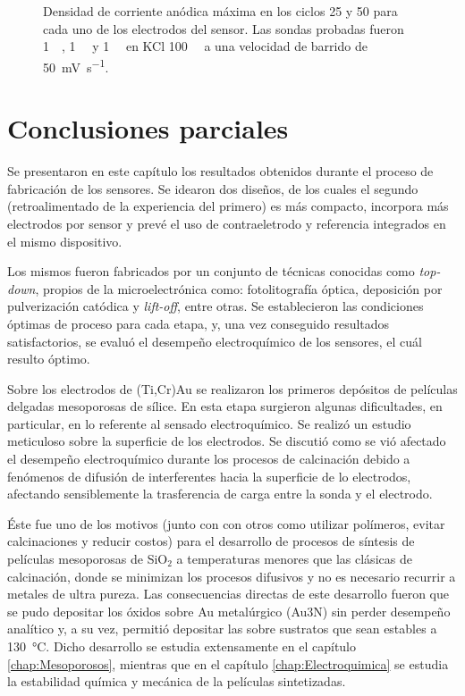 \begin{figure}[h!]
\begin{subfigure}[t]{0.329\textwidth}
		 	   \end{subfigure}
		      	\caption[Corriente de pico en distintos ciclos voltamperometricos]{Densidad de corriente anódica máxima en los ciclos 25 y 50 para cada uno de los electrodos del sensor. Las sondas probadas fueron \fc \SI{1}{\milli\Molar}, \fe\space \SI{1}{\milli\Molar} y \ru\space \SI{1}{\milli\Molar} en KCl \SI{100}{\milli\Molar} a una velocidad de barrido de \SI{50}{\milli\volt\per\second}.}
		      	\label{fig:barras}
		      	\end{figure}
 
\section{Conclusiones parciales}

	Se presentaron en este capítulo los resultados obtenidos durante el proceso de fabricación de los sensores. Se idearon dos diseños, de los cuales el segundo (retroalimentado de la experiencia del primero) es más compacto, incorpora más electrodos por sensor y prevé el uso de contraeletrodo y referencia integrados en el mismo dispositivo.
	
	Los mismos fueron fabricados por un conjunto de técnicas conocidas como \textit{top-down}, propios de la microelectrónica como: fotolitografía óptica, deposición por pulverización catódica y \textit{lift-off}, entre otras. Se establecieron las condiciones óptimas de proceso para cada etapa, y, una vez conseguido resultados satisfactorios, se evaluó el desempeño electroquímico de los sensores, el cuál resulto óptimo. 

	Sobre los electrodos de (Ti,Cr)\textbar Au se realizaron los primeros depósitos de películas delgadas mesoporosas de sílice. En esta etapa surgieron algunas dificultades, en particular, en lo referente al sensado electroquímico. Se realizó un estudio meticuloso sobre la superficie de los electrodos.  Se discutió como se vió afectado el desempeño electroquímico durante los procesos de calcinación debido a fenómenos de difusión de interferentes hacia la superficie de lo electrodos, afectando sensiblemente la trasferencia de carga entre la sonda y el electrodo. 

	Éste fue uno de los motivos (junto con con otros como utilizar polímeros, evitar calcinaciones y reducir costos) para el desarrollo de procesos de síntesis de películas mesoporosas de SiO$_2$ a temperaturas menores que las clásicas de calcinación, donde se minimizan los procesos difusivos y no es necesario recurrir a metales de ultra pureza. Las consecuencias directas de este desarrollo fueron que se pudo depositar los óxidos sobre Au metalúrgico (Au3N) sin perder desempeño analítico y, a su vez, permitió depositar las \pdm\space sobre sustratos que sean estables a \SI{130}{\celsius}. Dicho desarrollo se estudia extensamente en el capítulo \ref{chap:Mesoporosos}, mientras que en el capítulo \ref{chap:Electroquimica} se estudia la estabilidad química y mecánica de la películas sintetizadas.

